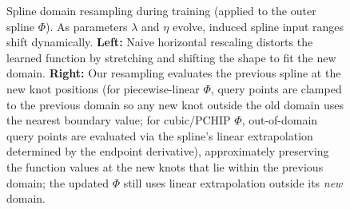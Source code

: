 \documentclass{article}
\theoremstyle{plain}
\theoremstyle{definition}
\theoremstyle{remark}
\begin{document}
\begin{figure}[ht]
    \caption{Spline domain resampling during training (applied to the outer spline $\Phi$). As parameters $\lambda$ and $\eta$ evolve, induced spline input ranges shift dynamically. \textbf{Left:} Naive horizontal rescaling distorts the learned function by stretching and shifting the shape to fit the new domain. \textbf{Right:} Our resampling evaluates the previous spline at the new knot positions (for piecewise-linear $\Phi$, query points are clamped to the previous domain so any new knot outside the old domain uses the nearest boundary value; for cubic/\textsc{PCHIP} $\Phi$, out-of-domain query points are evaluated via the spline's linear extrapolation determined by the endpoint derivative), approximately preserving the function values at the new knots that lie within the previous domain; the updated $\Phi$ still uses linear extrapolation outside its \emph{new} domain.}
    \label{fig:resampling}
\end{figure}
\end{document}
